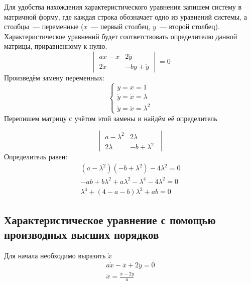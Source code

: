 \documentclass[12pt, a4paper]{article}
\begin{document}
    Для удобства нахождения характеристического уравнения запишем систему в матричной форму, где каждая строка обозначает одно из уравнений системы, а столбцы~--- переменные ($x$~---  первый столбец, $y$~--- второй столбец).
    Характеристическое уравнений будет соответствовать определителю данной матрицы, приравненному к нулю.\\

    \begin{displaymath}
        \begin{vmatrix}
            ax - \ddot x & 2 \dot y       \\
            2 \dot x     & - by + \ddot y
        \end{vmatrix}
        = 0
    \end{displaymath}
    Произведём замену переменных:
    \begin{equation*}
        \begin{cases}
            y = x = 1 \\
            \dot y = \dot x = \lambda \\
            \ddot y = \ddot x = \lambda^2
        \end{cases}
    \end{equation*}
    Перепишем матрицу с учётом этой замены и найдём её определитель

    \begin{equation*}
        \begin{vmatrix}
            a - \lambda^2 & 2 \lambda\;       \\
            2 \lambda     & - b + \lambda^2\;
        \end{vmatrix}
    \end{equation*}
    Определитель равен:
    \begin{align*}
    (a - \lambda^2)(- b + \lambda^2)
        - 4 \lambda^2 = 0\\
        - ab + b \lambda^2 + a \lambda^2 - \lambda^4 - 4 \lambda^2 = 0\\
        \boxed{
            \lambda^4 + (4 - a - b) \lambda^2 + ab = 0
        }
    \end{align*}

    \subsection{Характеристическое уравнение с помощью производных высших порядков}

    Для начала необходимо выразить $\dot x$
    \begin{gather*}
        a \dot x - \dddot x + 2 \ddot y = 0\\
        \dot x = \frac{\dddot x - 2 \ddot y}{a}
    \end{gather*}
\end{document}
